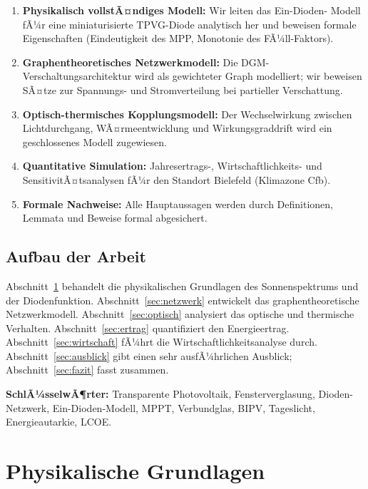 ﻿\documentclass[a4paper,12pt]{article}
\theoremstyle{definition}
\theoremstyle{remark}
\begin{document}
\begin{enumerate}
  \item \textbf{Physikalisch vollstÃ¤ndiges Modell:} Wir leiten das Ein-Dioden-
    Modell fÃ¼r eine miniaturisierte TPVG-Diode analytisch her und beweisen
    formale Eigenschaften (Eindeutigkeit des MPP, Monotonie des
    FÃ¼ll-Faktors).

  \item \textbf{Graphentheoretisches Netzwerkmodell:} Die
    DGM-Verschaltungsarchitektur wird als gewichteter Graph modelliert; wir
    beweisen SÃ¤tze zur Spannungs- und Stromverteilung bei partieller Verschattung.

  \item \textbf{Optisch-thermisches Kopplungsmodell:} Der
    Wechselwirkung zwischen Lichtdurchgang, WÃ¤rmeentwicklung und
    Wirkungsgraddrift wird ein geschlossenes Modell zugewiesen.

  \item \textbf{Quantitative Simulation:} Jahresertrags-, Wirtschaftlichkeits-
    und SensitivitÃ¤tsanalysen fÃ¼r den Standort Bielefeld (Klimazone Cfb).

  \item \textbf{Formale Nachweise:} Alle Hauptaussagen werden durch
    Definitionen, Lemmata und Beweise formal abgesichert.
\end{enumerate}

\subsection{Aufbau der Arbeit}

Abschnitt~\ref{sec:physik} behandelt die physikalischen Grundlagen des
Sonnenspektrums und der Diodenfunktion. Abschnitt~\ref{sec:netzwerk} entwickelt
das graphentheoretische Netzwerkmodell. Abschnitt~\ref{sec:optisch} analysiert
das optische und thermische Verhalten. Abschnitt~\ref{sec:ertrag} quantifiziert
den Energieertrag. Abschnitt~\ref{sec:wirtschaft} fÃ¼hrt die
Wirtschaftlichkeitsanalyse durch. Abschnitt~\ref{sec:ausblick} gibt einen sehr
ausfÃ¼hrlichen Ausblick; Abschnitt~\ref{sec:fazit} fasst zusammen.

\textbf{SchlÃ¼sselwÃ¶rter:} Transparente Photovoltaik, Fensterverglasung,
Dioden-Netzwerk, Ein-Dioden-Modell, MPPT, Verbundglas, BIPV,
Tageslicht, Energieautarkie, LCOE.

\section{Physikalische Grundlagen}
\label{sec:physik}
\end{document}

